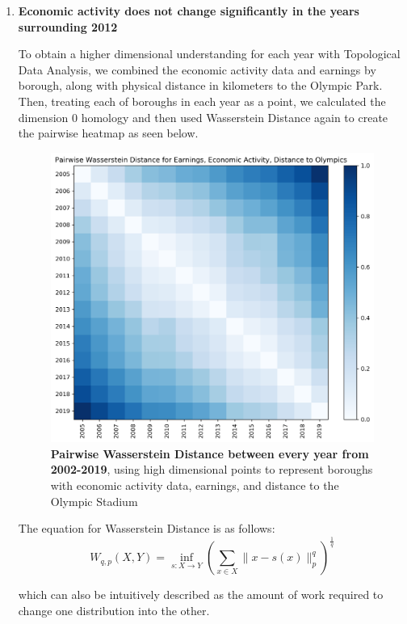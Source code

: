 \documentclass[11pt, twocolumn]{article}
\begin{document}
\begin{enumerate}
    \item \textbf{Economic activity does not change significantly in the years surrounding 2012}
    
    To obtain a higher dimensional understanding for each year with Topological Data Analysis, we combined the economic activity data and earnings by borough, along with physical distance in kilometers to the Olympic Park. Then, treating each of boroughs in each year as a point, we calculated the dimension 0 homology and then used Wasserstein Distance again to create the pairwise heatmap as seen below.
    
    \begin{figure}[H]
        \centering
            \includegraphics[scale=0.4]{econactincomedist.png}
        \caption{\textbf{Pairwise Wasserstein Distance between every year from 2002-2019}, using high dimensional points to represent boroughs with economic activity data, earnings, and distance to the Olympic Stadium}
        \label{fig:hybrid_heatmap}
    \end{figure}
    
    
    The equation for Wasserstein Distance is as follows: \[W_{q, p}(X, Y)=\inf _{s: X \rightarrow Y}\left(\sum_{x \in X}\|x-s(x)\|_{p}^{q}\right)^{\frac{1}{q}}\]
    
    which can also be intuitively described as the amount of work required to change one distribution into the other.
    

\end{enumerate}
\end{document}
